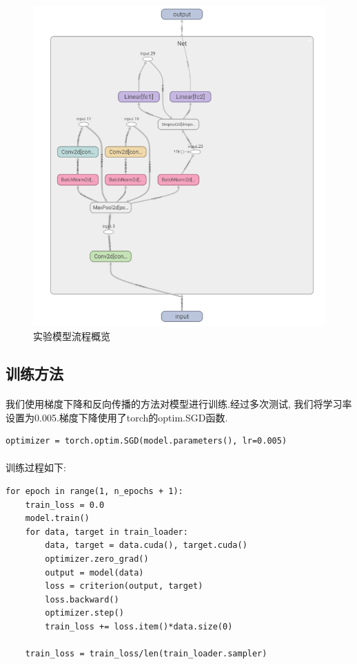 \documentclass[11pt]{article}
\begin{document}
\begin{figure}
    \centering
    \includegraphics[width=18cm]{images/structure.png}
    \caption{实验模型流程概览}
\end{figure} 
\subsection{训练方法}
\paragraph{}我们使用梯度下降和反向传播的方法对模型进行训练.经过多次测试, 我们将学习率设置为0.005.梯度下降使用了torch的optim.SGD函数.
\begin{verbatim}
optimizer = torch.optim.SGD(model.parameters(), lr=0.005)
\end{verbatim}
\paragraph{}训练过程如下:
\begin{verbatim}
for epoch in range(1, n_epochs + 1):
    train_loss = 0.0
    model.train()
    for data, target in train_loader:
        data, target = data.cuda(), target.cuda()
        optimizer.zero_grad()
        output = model(data)
        loss = criterion(output, target)
        loss.backward()
        optimizer.step()
        train_loss += loss.item()*data.size(0)

    train_loss = train_loss/len(train_loader.sampler)
\end{verbatim}
\end{document}
